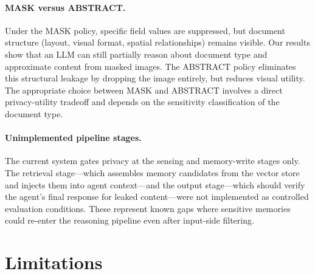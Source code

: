 \documentclass[11pt]{article}
\begin{document}
\paragraph{MASK versus ABSTRACT.} Under the MASK policy, specific field values are suppressed, but document structure (layout, visual format, spatial relationships) remains visible. Our results show that an LLM can still partially reason about document type and approximate content from masked images. The ABSTRACT policy eliminates this structural leakage by dropping the image entirely, but reduces visual utility. The appropriate choice between MASK and ABSTRACT involves a direct privacy-utility tradeoff and depends on the sensitivity classification of the document type.

\paragraph{Unimplemented pipeline stages.} The current system gates privacy at the sensing and memory-write stages only. The retrieval stage---which assembles memory candidates from the vector store and injects them into agent context---and the output stage---which should verify the agent's final response for leaked content---were not implemented as controlled evaluation conditions. These represent known gaps where sensitive memories could re-enter the reasoning pipeline even after input-side filtering.

\section{Limitations}
\end{document}
